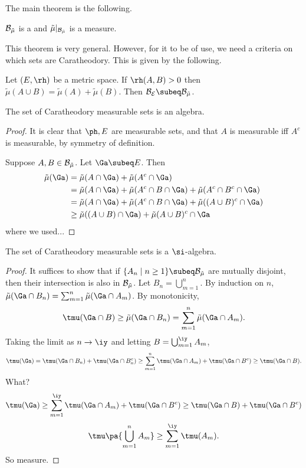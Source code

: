 The main theorem is the following.
\begin{thm}
$\cal B_{\tilde{\mu}}$ is a \sia{} and $\tilde{\mu}|_{\cal B_{\tilde{\mu}}}$ is a measure.
\end{thm}
This theorem is very general. However, for it to be of use, we need a criteria on which sets are Caratheodory. This is given by the following.
\begin{thm}
Let $(E,\rh)$ be a metric space. If $\rh(A,B)>0$ then $\tilde{\mu}(A\cup B)=\tilde{\mu}(A)+\tilde{\mu}(B)$. Then $\cal B_E\subeq \cal B_{\tilde{\mu}}$.
\end{thm}
\begin{lem}
The set of Caratheodory measurable sets is an algebra.
\end{lem}
\begin{proof}
It is clear that $\ph, E$ are measurable sets, and that $A$ is measurable iff $A^c$ is measurable, by symmetry of definition.

Suppose $A,B\in \cal B_{\tilde{\mu}}$. Let $\Ga\subeq E$. Then
\begin{align*}
\tilde{\mu}(\Ga)&=\tilde{\mu}(A\cap \Ga)+\tilde{\mu}(A^c\cap \Ga)\\
&=\tilde{\mu} (A\cap \Ga)+\tilde{\mu}(A^c \cap B\cap \Ga)+\tilde{\mu}(A^c\cap B^c\cap \Ga)\\
&=\tilde{\mu} (A\cap \Ga)+\tilde{\mu}(A^c \cap B\cap \Ga)+\tilde{\mu}((A\cup B)^c\cap \Ga)\\
&\ge \tilde{\mu}((A\cup B)\cap \Ga)+\tilde{\mu}(A\cup B)^c\cap \Ga
\end{align*}
where we used...
\end{proof}
\begin{lem}
The set of Caratheodory measurable sets is a $\si$-algebra.
\end{lem}
\begin{proof}
It suffices to show that if $\{A_n\mid n\ge 1\}\subeq \cal B_{\tilde{\mu}}$ are mutually disjoint, then their intersection is also in $\cal B_{\tilde{\mu}}$. Let $B_n=\bigcup_{m=1}^n$. By induction on $n$, $\tilde{\mu}(\Ga\cap B_n)=\sum_{m=1}^n \tilde{\mu}(\Ga\cap A_m)$. By monotonicity, 
\[\tmu(\Ga\cap B)\ge\tilde{\mu}(\Ga\cap B_n)=\sum_{m=1}^n \tilde{\mu}(\Ga\cap A_m).\]
Taking the limit as $n\to \iy$ and letting $B=\bigcup_{m=1}^{\iy} A_m$, 
\[
\tmu(\Ga)=\tmu(\Ga\cap B_n)+\tmu (\Ga\cap B_n^c)\ge \sum_{m=1}^n \tmu(\Ga\cap A_m)+\tmu (\Ga\cap B^c)\ge\tmu(\Ga \cap B).
\]
What?
\[
\tmu(\Ga)\ge \sum_{m=1}^{\iy} \tmu(\Ga\cap A_m) +\tmu (\Ga\cap B^c)\ge \tmu(\Ga\cap B)+\tmu(\Ga\cap B^c)
\]
\[
\tmu\pa{\bigcup_{m=1}^n A_m}\ge \sum_{m=1}^{\iy}\tmu(A_m).
\]
So measure.
\end{proof}
